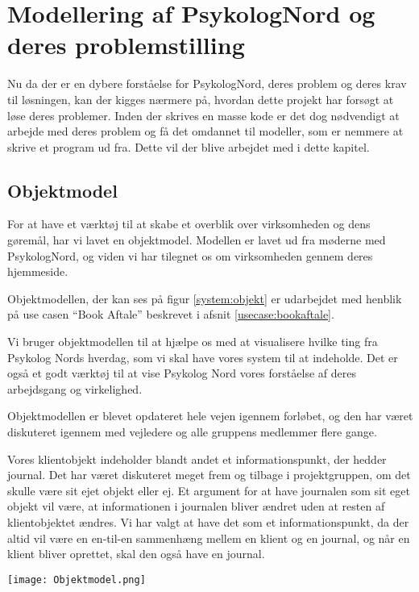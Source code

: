 \section{Modellering af PsykologNord og deres problemstilling}

Nu da der er en dybere forståelse for PsykologNord, deres problem og deres krav til løsningen, kan der kigges nærmere på, hvordan dette projekt har forsøgt at løse deres problemer.
Inden der skrives en masse kode er det dog nødvendigt at arbejde med deres problem og få det omdannet til modeller, som er nemmere at skrive et program ud fra.
Dette vil der blive arbejdet med i dette kapitel.

\subsection{Objektmodel}

For at have et værktøj til at skabe et overblik over virksomheden og dens gøremål, har vi lavet en objektmodel.
Modellen er lavet ud fra møderne med PsykologNord, og viden vi har tilegnet os om virksomheden gennem deres hjemmeside.\cite{psykolognord}

Objektmodellen, der kan ses på figur \ref{system:objekt} er udarbejdet med henblik på use casen ``Book Aftale'' beskrevet i afsnit \ref{usecase:bookaftale}.

Vi bruger objektmodellen til at hjælpe os med at visualisere hvilke ting fra Psykolog Nords hverdag, som vi skal have vores system til at indeholde.
Det er også et godt værktøj til at vise Psykolog Nord vores forståelse af deres arbejdsgang og virkelighed.

Objektmodellen er blevet opdateret hele vejen igennem forløbet, og den har været diskuteret igennem med vejledere og alle gruppens medlemmer flere gange.

Vores klientobjekt indeholder blandt andet et informationspunkt, der hedder journal.
Det har været diskuteret meget frem og tilbage i projektgruppen, om det skulle være sit ejet objekt eller ej.
Et argument for at have journalen som sit eget objekt vil være, at informationen i journalen bliver ændret uden at resten af klientobjektet ændres.
Vi har valgt at have det som et informationspunkt, da der altid vil være en en-til-en sammenhæng mellem en klient og en journal, og når en klient bliver oprettet, skal den også have en journal.

\begin{sidewaysfigure}
    \caption{Objektmodel for Book Aftale}
    \centering
        \texttt{[image: Objektmodel.png]}
    \label{system:objekt}
\end{sidewaysfigure}

